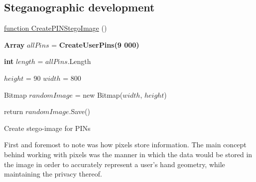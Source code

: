 \subsection{Steganographic development}


\begin{algorithm}
     
     \underline{function CreatePINStegoImage} ()\;
     
     \textbf{Array} $allPins$ = \textbf{CreateUserPins(9 000)}\;
     
     
     \textbf{int} $length$ = $allPins$.Length\;
     
     $height$ = 90\;
     $width$ = 800\;
     
     Bitmap $randomImage$ = new Bitmap($width$, $height$)\;
     
     
     return $randomImage$.Save()\;
     
     \caption{Create stego-image for PINs}
     \label{alg: Create stego-image for PINs}
\end{algorithm}

First and foremost to note was how pixels store information. The main concept behind working with pixels was the manner in which the data would be stored in the image in order to accurately represent a user’s hand geometry, while maintaining the privacy thereof. 

